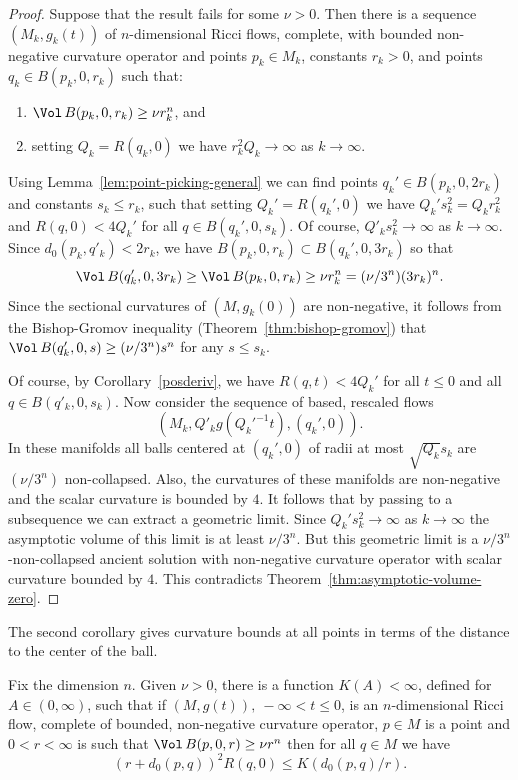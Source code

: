 \begin{proof}
Suppose that the result fails for some $\nu>0$. Then there is a
sequence $(M_k,g_k(t))$ of $n$-dimensional Ricci flows, complete,
with bounded non-negative curvature operator and  points $p_k\in
M_k$, constants $r_k>0$, and points $q_k\in B(p_k,0,r_k)$ such that:
\begin{enumerate}
\item[(1)] $\Vol\,B(p_k,0,r_k)\ge \nu r_k^n$, and
\item[(2)] setting $Q_k=R(q_k,0)$ we have $r_k^2Q_k\rightarrow\infty$ as $k\rightarrow\infty$.
\end{enumerate}
Using Lemma~\ref{lem:point-picking-general} we can find points $q_k'\in B(p_k,0,2r_k)$
and constants $s_k\le r_k$, such that setting $Q_k'=R(q_k',0)$ we
have $Q_k's_k^2=Q_kr_k^2$ and  $R(q,0)<4Q_k'$ for all $q\in
B(q_k',0,s_k)$.  Of course, $Q'_ks_k^2\rightarrow\infty$ as
$k\rightarrow\infty$. Since $d_0(p_k,q'_k)<2r_k$, we have
$B(p_k,0,r_k)\subset B(q_k',0,3r_k)$ so that
$$\Vol\,B(q_k',0,3r_k)\ge \Vol\,B(p_k,0,r_k)\ge \nu
r_k^n=(\nu/3^n)(3r_k)^n.$$ Since the sectional curvatures of
$(M,g_k(0))$ are non-negative, it follows from the Bishop-Gromov
inequality (Theorem~\ref{thm:bishop-gromov}) that $\Vol\,B(q_k',0,s)\ge (\nu/3^n)s^n$ for any $s\le s_k$.

Of course, by Corollary~\ref{posderiv}, we have $R(q,t)<4Q_k'$ for
all $t\le 0$ and all $q\in B(q'_k,0,s_k)$. Now consider the sequence
of based, rescaled flows $$(M_k,Q'_kg(Q_k'^{-1}t),(q_k',0)).$$ In
these manifolds all balls centered at $(q_k',0)$ of radii at most
$\sqrt{Q_k}s_k$ are
 $(\nu/3^n)$ non-collapsed. Also, the curvatures of these manifolds
 are non-negative and the scalar curvature is bounded by $4$.
 It follows that by passing to a subsequence we can extract a
geometric limit.
 Since $Q_k's_k^2\rightarrow\infty$
as $k\rightarrow\infty$ the asymptotic volume of this limit is at
least $\nu/3^n$. But this geometric limit is a
$\nu/3^n$-non-collapsed ancient solution with non-negative curvature
operator with scalar curvature bounded by $4$.  This contradicts
Theorem~\ref{thm:asymptotic-volume-zero}.
\end{proof}

The second corollary gives curvature bounds at all points in terms
of the distance to the center of the ball.


\begin{corollary}\label{cor:global-curvature-bound-from-volume}
\label{global}
Fix the dimension $n$. Given $\nu>0$,  there is a function
$K(A)<\infty$, defined for $A\in (0,\infty)$, such that if
$(M,g(t)),\ -\infty<t\le 0$, is an $n$-dimensional Ricci flow,
complete of bounded, non-negative curvature operator, $p\in M$ is a
point and $0<r<\infty$ is such that $\Vol\,B(p,0,r)\ge \nu r^n$
then for all $q\in M$ we have
$$(r+d_0(p,q))^2R(q,0)\le K(d_0(p,q)/r).$$
\end{corollary}


